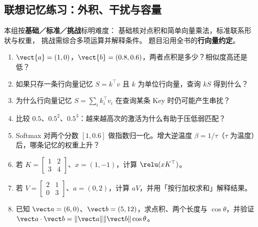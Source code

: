 \subsection{联想记忆练习：外积、干扰与容量}

本组按\textbf{基础／标准／挑战}标明难度：
基础核对点积和简单向量乘法，标准联系形状与权重，
挑战需综合多项运算并解释条件。
题目沿用全书的\textbf{行向量约定}。

\begin{enumerate}[label=\textbf{C3-\arabic*.}]
\item {}\label{exercise:C3-1}   $\vect{a}=(1,0)$，$\vect{b}=(0.8,0.6)$，两者点积是多少？相似度高还是低？
\item {}\label{exercise:C3-2}   如果只存一条行向量记忆 $S=k^\top v$ 且 $k$ 为单位行向量，查询 $kS$ 得到什么？
\item {}\label{exercise:C3-3}   为什么行向量记忆 $S=\sum_i k_i^\top v_i$ 在查询某条 Key 时仍可能产生串扰？
\item {}\label{exercise:C3-4}   比较 $0.5$、$0.5^2$、$0.5^3$：越来越高次的激活为什么有助于压低弱匹配？
\item {}\label{exercise:C3-5}   Softmax 对两个分数 $[1,0.6]$ 做指数归一化。增大逆温度 $\beta=1/\tau$（$\tau$ 为温度）后，哪条记忆的权重上升？
\item {}\label{exercise:C3-6}   若 $K=\begin{bmatrix}1&2\\3&4\end{bmatrix}$、$x=(1,-1)$，计算 $\relu(xK^\top)$。
\item {}\label{exercise:C3-7}   若 $V=\begin{bmatrix}2&1\\0&3\end{bmatrix}$、$a=(0,2)$，计算 $aV$，并用「按行加权求和」解释结果。
\item {}\label{exercise:C3-8}   已知 $\vect a=(6,0)$、$\vect b=(5,12)$，求点积、两个长度与 $\cos\theta$，并验证 $\vect a\cdot\vect b=\|\vect a\|\|\vect b\|\cos\theta$。

\end{enumerate}
